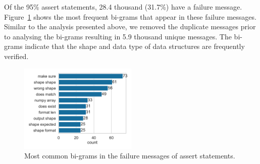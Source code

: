 Of the 95\% assert statements, 28.4 thousand (31.7\%) have a failure message. Figure~\ref{fig:common-assert-msgs} shows the most frequent bi-grams that appear in these failure messages. Similar to the analysis presented above, we removed the duplicate messages prior to analysing the bi-grams resulting in 5.9 thousand unique messages. The bi-grams indicate that the shape and data type of data structures are frequently verified.


\begin{figure}
  \centering
  \includegraphics[width=0.5\textwidth]{common-assert-msgs.pdf}
  \caption{Most common bi-grams in the failure messages of assert statements.}
  \label{fig:common-assert-msgs}
\end{figure}

